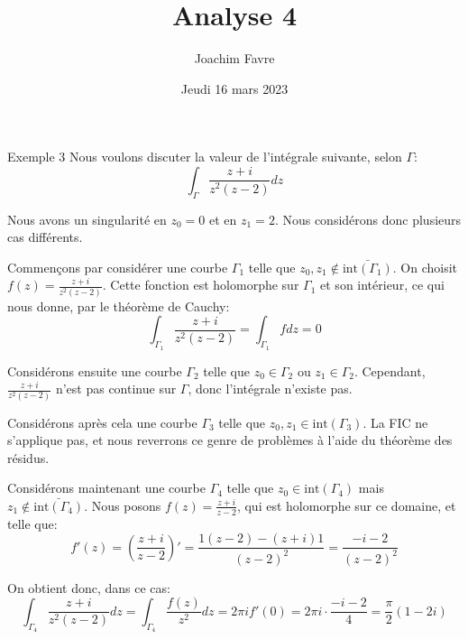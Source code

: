 \documentclass[a4paper]{article}
\title{Analyse 4}
\author{Joachim Favre}
\date{Jeudi 16 mars 2023}
\begin{document}
\maketitle


\begin{parag}{Exemple 3}
    Nous voulons discuter la valeur de l'intégrale suivante, selon $\Gamma$: 
    \[\int_{\Gamma} \frac{z + i}{z^2 \left(z - 2\right)}dz\]

    Nous avons un singularité en $z_0 = 0$ et en $z_1 = 2$. Nous considérons donc plusieurs cas différents.
    
    Commençons par considérer une courbe $\Gamma_1$ telle que $z_0, z_1 \not \in \bar{\text{int}\left(\Gamma_1\right)}$. On choisit $f\left(z\right) = \frac{z+i}{z^2\left(z-2\right)}$. Cette fonction est holomorphe sur $\Gamma_1$ et son intérieur, ce qui nous donne, par le théorème de Cauchy: 
    \[\int_{\Gamma_1} \frac{z + i}{z^2 \left(z-2\right)} = \int_{\Gamma_1} f dz = 0\]

    Considérons ensuite une courbe $\Gamma_2$ telle que $z_0 \in \Gamma_2$ ou $z_1 \in \Gamma_2$. Cependant, $\frac{z+i}{z^2 \left(z - 2\right)}$ n'est pas continue sur $\Gamma$, donc l'intégrale n'existe pas.

    Considérons après cela une courbe $\Gamma_3$ telle que $z_0, z_1 \in \text{int}\left(\Gamma_3\right)$. La FIC ne s'applique pas, et nous reverrons ce genre de problèmes à l'aide du théorème des résidus.

    Considérons maintenant une courbe $\Gamma_4$ telle que $z_0 \in \text{int}\left(\Gamma_4\right)$ mais $z_1 \not \in \bar{\text{int}\left(\Gamma_4\right)}$. Nous posons $f\left(z\right) = \frac{z+i}{z-2}$, qui est holomorphe sur ce domaine, et telle que: 
    \[f'\left(z\right) = \left(\frac{z+i}{z-2}\right)' = \frac{1\left(z-2\right)-  \left(z+i\right)1}{\left(z-2\right)^2} = \frac{-i-2}{\left(z-2\right)^2}\]

    On obtient donc, dans ce cas:
    \[\int_{\Gamma_4} \frac{z+i}{z^2 \left(z-2\right)}dz = \int_{\Gamma_4} \frac{f\left(z\right)}{z^2} dz = 2\pi i f'\left(0\right) = 2\pi i \cdot  \frac{-i-2}{4} = \frac{\pi}{2} \left(1 - 2i\right)\]


\end{parag}
\end{document}
